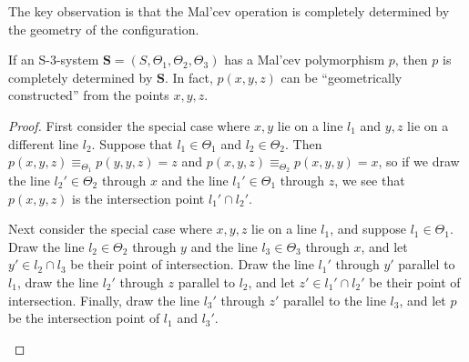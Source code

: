 \documentclass[letterpaper,11pt]{article}
\begin{document}
The key observation is that the Mal'cev operation is completely determined by the geometry of the configuration.

\begin{lem} If an S-3-system $\mathbf{S} = (S,\Theta_1,\Theta_2,\Theta_3)$ has a Mal'cev polymorphism $p$, then $p$ is completely determined by $\mathbf{S}$. In fact, $p(x,y,z)$ can be ``geometrically constructed'' from the points $x,y,z$.
\end{lem}
\begin{proof} First consider the special case where $x,y$ lie on a line $l_1$ and $y,z$ lie on a different line $l_2$. Suppose that $l_1 \in \Theta_1$ and $l_2 \in \Theta_2$. Then $p(x,y,z) \equiv_{\Theta_1} p(y,y,z) = z$ and $p(x,y,z) \equiv_{\Theta_2} p(x,y,y) = x$, so if we draw the line $l_2' \in \Theta_2$ through $x$ and the line $l_1' \in \Theta_1$ through $z$, we see that $p(x,y,z)$ is the intersection point $l_1' \cap l_2'$.

\begin{center}
\end{center}

Next consider the special case where $x,y,z$ lie on a line $l_1$, and suppose $l_1 \in \Theta_1$. Draw the line $l_2 \in \Theta_2$ through $y$ and the line $l_3 \in \Theta_3$ through $x$, and let $y' \in l_2 \cap l_3$ be their point of intersection. Draw the line $l_1'$ through $y'$ parallel to $l_1$, draw the line $l_2'$ through $z$ parallel to $l_2$, and let $z' \in l_1' \cap l_2'$ be their point of intersection. Finally, draw the line $l_3'$ through $z'$ parallel to the line $l_3$, and let $p$ be the intersection point of $l_1$ and $l_3'$.

\begin{center}
\end{center}


\end{proof}
\end{document}
